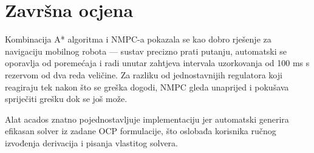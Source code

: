 \section{Završna ocjena}

Kombinacija A* algoritma i NMPC-a pokazala se kao dobro rješenje za navigaciju mobilnog robota --- sustav precizno prati putanju, automatski se oporavlja od poremećaja i radi unutar zahtjeva intervala uzorkovanja od 100 ms s rezervom od dva reda veličine. Za razliku od jednostavnijih regulatora koji reagiraju tek nakon što se greška dogodi, NMPC gleda unaprijed i pokušava spriječiti grešku dok se još može.

Alat acados znatno pojednostavljuje implementaciju jer automatski generira efikasan solver iz zadane OCP formulacije, što oslobađa korisnika ručnog izvođenja derivacija i pisanja vlastitog solvera. 